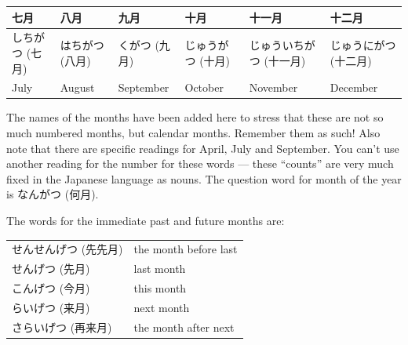 \documentclass[11pt, b5paper, twoside, openright, onecolumn]{book}
\makeatletter
\newcommand*{\rtrubystack}[2]{{\relscale{0.5}%
  \begin{tabular}[b]{@{}c@{}}%
    {#1}\\%
    {\textscale{2}{#2}}%
  \end{tabular}}%
}
\DeclareRobustCommand*{\rtruby}[2]{%
  \mbox{%
    \setlength{\parskip}{0ex}%
    \BeginAccSupp{method=pdfstringdef,ActualText={#1}}%
      \rtrubystack{\phantom{#2}}{#1}%
      \llap{%
        \rtrubystack{#2}{\phantom{#1}}%
      }%
    \EndAccSupp{}%
  }%
}
\newcommand*{\rubystack}[2]{{\relscale{0.5}%
  \begin{tabular}[b]{@{}c@{}}%
    {#1}\\%
   {\textscale{2}{#2}}%
  \end{tabular}}%
}
\DeclareRobustCommand*{\ruby}[2]{%
  \mbox{%
    \setlength{\parskip}{0ex}%
    \BeginAccSupp{method=pdfstringdef,ActualText={#1}}%
      \rubystack{\phantom{#2}}{#1}%
      \llap{%
        \rubystack{#2}{\phantom{#1}}%
      }%
    \EndAccSupp{}%
  }%
}
\renewcommand*{\rtruby}[2]{#2 (#1)}%
\renewcommand*{\ruby}[2]{#2 (#1)}%
\newenvironment{mytabularcentered}[1]{\noindent
\begin{center}\begin{tabular}[h]{#1}}{\end{tabular}\end{center}}
\makeatother
\begin{document}
\smaller
\begin{center}
\begin{mytabularcentered}{| l  l  l  l  l  l |}\hline 
\rule{0pt}{2.4ex}七月 & 八月 & 九月 & 十月 & 十一月 & 十二月\\ 
\hline
\rule{0pt}{3.6ex}\index[japanese]{しちがつ (七月)}\rtruby{七月}{しちがつ} & \index[japanese]{はちがつ (八月)}\rtruby{八月}{はちがつ} & \index[japanese]{くがつ (九月)}\rtruby{九月}{くがつ} & \index[japanese]{じゅうがつ (十月)}\rtruby{十月}{じゅうがつ} & \index[japanese]{じゅういちがつ (十一月)}\rtruby{十一月}{じゅういちがつ} & \index[japanese]{じゅうにがつ (十二月)}\rtruby{十二月}{じゅうにがつ}\\ 
\rule{0pt}{2.4ex}July & August & September & October & November & December\\ 
\hline 
\end{mytabularcentered}
\end{center}
\larger
\vspace{0.5cm}


The names of the months have been added here to stress that these are not so much numbered months‚ but calendar months. Remember them as such! Also note that there are specific readings for April‚ July and September. You can’t use another reading for the number for these words — these “counts” are very much fixed in the Japanese language as nouns. The question word for month of the year is \ruby{何月}{なんがつ}.

The words for the immediate past and future months are:

\vspace{0.5cm}
\smaller
\begin{center}
\begin{mytabularcentered}{| l  l |}\hline 
\rule{0pt}{3.6ex}\index[japanese]{せんせんげつ (先先月)}\rtruby{先先月}{せんせんげつ} & the \index[english]{Month before last}month before last\\ 
\rule{0pt}{3.6ex}\index[japanese]{せんげつ (先月)}\rtruby{先月}{せんげつ} & \index[english]{Last month}last month\\ 
\rule{0pt}{3.6ex}\index[japanese]{こんげつ (今月)}\rtruby{今月}{こんげつ} & \index[english]{This month}this month\\ 
\rule{0pt}{3.6ex}\index[japanese]{らいげつ (来月)}\rtruby{来月}{らいげつ} & \index[english]{Next month}next month\\ 
\rule{0pt}{3.6ex}\index[japanese]{さらいげつ (再来月)}\rtruby{再来月}{さらいげつ} & the \index[english]{Month after next}month after next\\ 
\hline 
\end{mytabularcentered}
\end{center}
\larger
\vspace{0.5cm}
\end{document}
